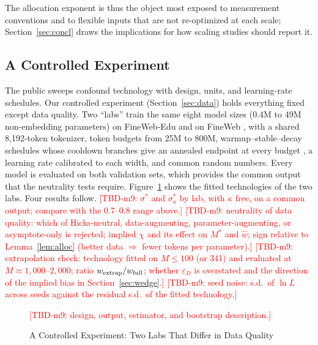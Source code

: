 The allocation exponent is thus the object most exposed to measurement conventions and to flexible inputs that are
not re-optimized at each scale; Section~\ref{sec:concl} draws the implications for how scaling studies should report
it.

\subsection{A Controlled Experiment}\label{sec:tech:experiment}

The public sweeps confound technology with design, units, and learning-rate schedules. Our controlled experiment
(Section~\ref{sec:data}) holds everything fixed except data quality. Two ``labs'' train the same eight model sizes
(0.4M to 49M non-embedding parameters) on FineWeb-Edu and on FineWeb \citep{penedo2024fineweb}, with a shared
8,192-token tokenizer, token budgets from 25M to 800M, warmup--stable--decay schedules whose cooldown branches give an
annealed endpoint at every budget \citep{hagele2024scaling}, a learning rate calibrated to each width, and common
random numbers. Every model is evaluated on both validation sets, which provides the common output that the
neutrality tests require. Figure~\ref{fig:experiment} shows the fitted technologies of the two labs. Four results
follow.
\textcolor{red}{[TBD-m9: $\sigma^*$ and $\sigma^*_\kappa$ by lab, with $\kappa$ free, on a common output; compare with the 0.7--0.8 range above.]}
\textcolor{red}{[TBD-m9: neutrality of data quality: which of Hicks-neutral, data-augmenting, parameter-augmenting, or asymptote-only is rejected; implied $\chi$ and its effect on $M^*$ and $\hat w$; sign relative to Lemma~\ref{lem:alloc} (better data $\Rightarrow$ fewer tokens per parameter).]}
\textcolor{red}{[TBD-m9: extrapolation check: technology fitted on $M\le100$ (or 341) and evaluated at $M\approx1{,}000$--$2{,}000$; ratio $w_{\rm extrap}/w_{\rm full}$; whether $\varepsilon_D$ is overstated and the direction of the implied bias in Section~\ref{sec:wedge}.]}
\textcolor{red}{[TBD-m9: seed noise: s.d.\ of $\ln L$ across seeds against the residual s.d.\ of the fitted technology.]}

\begin{figure}[tp]
\centering
{}
\caption{A Controlled Experiment: Two Labs That Differ in Data Quality}\label{fig:experiment}
\begin{figurenotes}
\textcolor{red}{[TBD-m9: design, output, estimator, and bootstrap description.]}
\end{figurenotes}
\end{figure}
